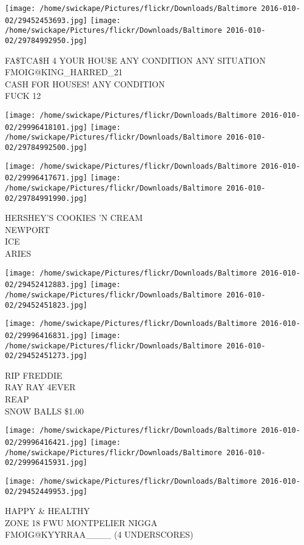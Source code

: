 \documentclass[10pt,letterpaper]{article}
\begin{document}
\texttt{[image: /home/swickape/Pictures/flickr/Downloads/Baltimore 2016-010-02/29452453693.jpg]}
\texttt{[image: /home/swickape/Pictures/flickr/Downloads/Baltimore 2016-010-02/29784992950.jpg]}

FA\$TCA\$H 4 YOUR HOU\$E ANY CONDITION ANY SITUATION\\
FMOIG@KING\_HARRED\_21\\
CASH FOR HOUSES!  ANY CONDITION\\
FUCK 12
\pagebreak

\texttt{[image: /home/swickape/Pictures/flickr/Downloads/Baltimore 2016-010-02/29996418101.jpg]}
\texttt{[image: /home/swickape/Pictures/flickr/Downloads/Baltimore 2016-010-02/29784992500.jpg]}

\texttt{[image: /home/swickape/Pictures/flickr/Downloads/Baltimore 2016-010-02/29996417671.jpg]}
\texttt{[image: /home/swickape/Pictures/flickr/Downloads/Baltimore 2016-010-02/29784991990.jpg]}

HERSHEY'S COOKIES 'N CREAM\\
NEWPORT\\
ICE\\
ARIES
\pagebreak

\texttt{[image: /home/swickape/Pictures/flickr/Downloads/Baltimore 2016-010-02/29452412883.jpg]}
\texttt{[image: /home/swickape/Pictures/flickr/Downloads/Baltimore 2016-010-02/29452451823.jpg]}

\texttt{[image: /home/swickape/Pictures/flickr/Downloads/Baltimore 2016-010-02/29996416831.jpg]}
\texttt{[image: /home/swickape/Pictures/flickr/Downloads/Baltimore 2016-010-02/29452451273.jpg]}

RIP FREDDIE\\
RAY RAY 4EVER\\
REAP\\
SNOW BALLS \$1.00
\pagebreak

\texttt{[image: /home/swickape/Pictures/flickr/Downloads/Baltimore 2016-010-02/29996416421.jpg]}
\texttt{[image: /home/swickape/Pictures/flickr/Downloads/Baltimore 2016-010-02/29996415931.jpg]}

\vspace{0.25in}
\texttt{[image: /home/swickape/Pictures/flickr/Downloads/Baltimore 2016-010-02/29452449953.jpg]}

HAPPY \& HEALTHY\\
ZONE 18 FWU MONTPELIER NIGGA\\
FMOIG@KYYRRAA\_\_\_\_ (4 UNDERSCORES)
\pagebreak
\end{document}
